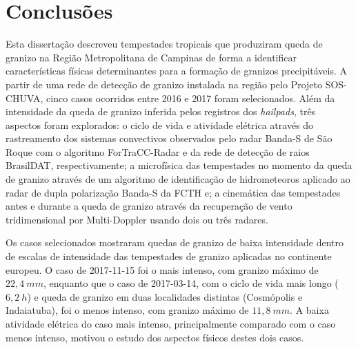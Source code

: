 \chapter{Conclusões}\label{conclusoes}

Esta dissertação descreveu tempestades tropicais que produziram queda de granizo na Região Metropolitana de Campinas de forma a identificar características físicas determinantes para a formação de granizos precipitáveis. A partir de uma rede de detecção de granizo instalada na região pelo Projeto SOS-CHUVA, cinco casos ocorridos entre 2016 e 2017 foram selecionados. Além da intensidade da queda de granizo inferida pelos registros dos \textit{hailpads}, três aspectos foram explorados: o ciclo de vida e atividade elétrica através do rastreamento dos sistemas convectivos observados pelo radar Banda-S de São Roque com o algoritmo ForTraCC-Radar e da rede de detecção de raios BrasilDAT, respectivamente; a microfísica das tempestades no momento da queda de granizo através de um algoritmo de identificação de hidrometeoros aplicado ao radar de dupla polarização Banda-S da FCTH e; a cinemática das tempestades antes e durante a queda de granizo através da recuperação de vento tridimensional por Multi-Doppler usando dois ou três radares.

Os casos selecionados mostraram quedas de granizo de baixa intensidade dentro de escalas de intensidade das tempestades de granizo aplicadas no continente europeu. O caso de 2017-11-15 foi o mais intenso, com granizo máximo de $22,4\:mm$, enquanto que o caso de 2017-03-14, com o ciclo de vida mais longo ($6,2\:h$) e queda de granizo em duas localidades distintas (Cosmópolis e Indaiatuba), foi o menos intenso, com granizo máximo de $11,8\:mm$. A baixa atividade elétrica do caso mais intenso, principalmente comparado com o caso menos intenso, motivou o estudo dos aspectos físicos destes dois casos. 

